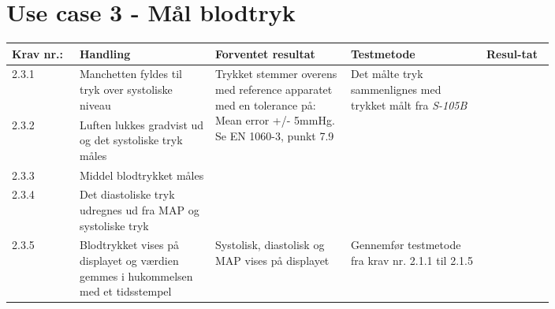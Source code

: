 	\pagebreak
	\section{Use case 3 - Mål blodtryk}
				\begin{longtable}{|p{0.1\linewidth}|p{0.2\linewidth}|p{0.2\linewidth}|p{0.2\linewidth}|p{0.1\linewidth}|}
					\hline
					\rowcolor{usDef}
					Krav nr.: & Handling & Forventet resultat & Testmetode & Resul-tat  \\\hline
					2.3.1 & Manchetten fyldes til tryk over systoliske niveau &  \multirow{4}{\linewidth}{Trykket stemmer overens med reference apparatet med en tolerance på: Mean error +/- 5mmHg. Se EN 1060-3, punkt 7.9} &\multirow{4}{\linewidth}{Det målte tryk sammenlignes med trykket målt fra \textit{S-105B}} & \multirow{4}{\linewidth}{}  \\ \cline{1-2}
					2.3.2 & Luften lukkes gradvist ud og det systoliske tryk måles &  &  &   \\ \cline{1-2} 
					2.3.3 & Middel blodtrykket måles & & & \\ \cline{1-2} 
					2.3.4 &  Det diastoliske tryk udregnes ud fra MAP og systoliske tryk  & & & \\ \hline
					2.3.5 & Blodtrykket vises på displayet og værdien gemmes i hukommelsen med et tidsstempel & Systolisk, diastolisk og MAP vises på displayet & Gennemfør testmetode fra krav nr. 2.1.1 til 2.1.5 & \\ \hline
				\end{longtable}